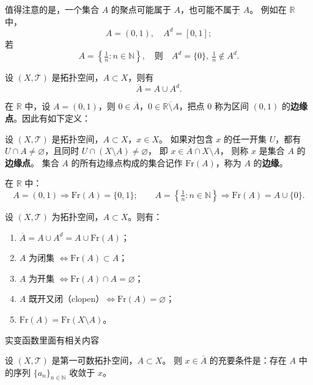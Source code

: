 \begin{remark}
值得注意的是，一个集合 $A$ 的聚点可能属于 $A$，也可能不属于 $A$。  
例如在 $\mathbb{R}$ 中，
\[
A = (0,1), \quad A^{d} = [0,1];
\]
若
\[
A = \left\{ \tfrac{1}{n} : n \in \mathbb{N} \right\},
\quad \text{则} \quad A^{d} = \{0\}, \ \tfrac{1}{n} \notin A^{d}.
\]
\end{remark}
\begin{theorem}[闭包是原集并导集]
设 $(X,\mathcal{T})$ 是拓扑空间，$A\subset X$，则有
\[
\overline{A} = A \cup A^{d}.
\]
\end{theorem}

\noindent
在 $\mathbb{R}$ 中，设 $A=(0,1)$，则 $0\in \overline{A}$，$0\in \overline{\mathbb{R}\setminus A}$，把点 $0$ 称为区间 $(0,1)$ 的\textbf{边缘点}。因此有如下定义：

\begin{definition}[ 边缘=闭包 − 内部，]
设 $(X,\mathcal{T})$ 是拓扑空间，$A\subset X$，$x\in X$。  
如果对包含 $x$ 的任一开集 $U$，都有 $U\cap A\neq\varnothing$，且同时 $U\cap(X\setminus A)\neq\varnothing$，  
即 $x\in \overline{A}\cap \overline{X\setminus A}$，  
则称 $x$ 是集合 $A$ 的\textbf{边缘点}。  
集合 $A$ 的所有边缘点构成的集合记作 $\mathrm{Fr}(A)$，称为 $A$ 的\textbf{边缘}。
\end{definition}

\noindent
在 $\mathbb{R}$ 中：
\[
A = (0,1) \Rightarrow \mathrm{Fr}(A)=\{0,1\};
\qquad
A = \left\{\tfrac{1}{n}:n\in\mathbb{N}\right\} \Rightarrow \mathrm{Fr}(A)=A\cup\{0\}.
\]

\begin{theorem}[与边缘有关的等价关系]
设 $(X,\mathcal{T})$ 为拓扑空间，$A\subset X$。则有：
\begin{enumerate}[(1)]
\item $\overline{A}=A\cup A^{d}=A\cup \mathrm{Fr}(A)$；
\item $A$ 为闭集 $\iff \mathrm{Fr}(A)\subset A$；
\item $A$ 为开集 $\iff \mathrm{Fr}(A)\cap A=\varnothing$；
\item $A$ 既开又闭（clopen）$\iff \mathrm{Fr}(A)=\varnothing$；
\item $\mathrm{Fr}(A)=\mathrm{Fr}(X\setminus A)$。
\end{enumerate}
\end{theorem}
实变函数里面有相关内容
\begin{theorem}
设 $(X,\mathcal{T})$ 是第一可数拓扑空间，$A\subset X$。  
则 $x\in \overline{A}$ 的充要条件是：存在 $A$ 中的序列 $\{a_n\}_{n\in\mathbb{N}}$ 收敛于 $x$。
\end{theorem}
